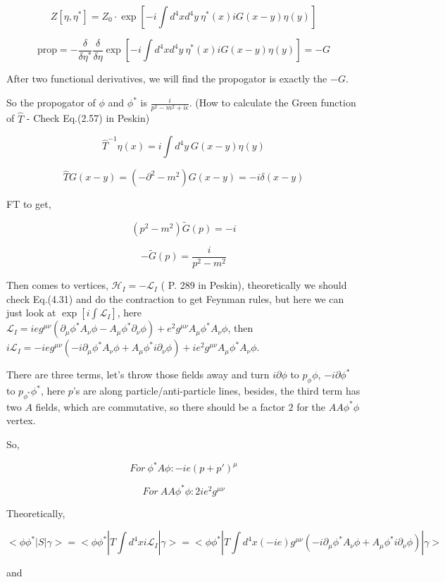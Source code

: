 \documentclass[prd,aps,nofootinbib,floatfix,10pt]{revtex4}
\newcommand{\blue}[1]{{\color{blue} #1}}
\begin{document}
\[ Z[\eta, \eta^*] = Z_0 \cdot \exp[-i\int d^4 x d^4 y \ \eta^*(x) i G(x-y) \eta(y) ] \]

\[ \text{prop} = -\frac{\delta}{\delta \eta^*}\frac{\delta}{\delta \eta} \exp[-i\int d^4 x d^4 y \ \eta^*(x) i G(x-y) \eta(y) ] = -G \]

After two functional derivatives, we will find the propogator is exactly the $-G$.

So the propogator of $\phi$ and $\phi^*$ is $\frac{i}{p^2 - m^2 + i \epsilon}$. (How to calculate the Green function of $\hat{T}$ - \blue{Check Eq.(2.57) in Peskin})

\[ \hat{T}^{-1} \eta(x) = i \int d^4 y \ G(x-y) \eta(y) \]

\[ \hat{T} G(x-y)  = (-\partial^2-m^2) G(x-y) = -i \delta(x-y) \]

FT to get,

\[ (p^2 - m^2) \tilde{G}(p) = -i \]

\[ -\tilde{G}(p) = \frac{i}{p^2 - m^2} \]

Then comes to vertices, $\mathcal{H}_{I} = - \mathcal{L}_I$ (\blue{P. 289 in Peskin}), theoretically we should check \blue{Eq.(4.31)} and do the contraction to get Feynman rules, but here we can just look at $\exp[i \int \mathcal{L}_I]$, here $\mathcal{L}_I = i e g^{\mu \nu} (\partial_{\mu} \phi^* A_{\nu} \phi - A_{\mu} \phi^* \partial_{\nu} \phi) + e^2 g^{\mu \nu} A_{\mu} \phi^* A_{\nu} \phi$, then $i \mathcal{L}_I = -i e g^{\mu \nu} (-i \partial_{\mu} \phi^* A_{\nu} \phi + A_{\mu} \phi^* i \partial_{\nu} \phi) + i e^2 g^{\mu \nu} A_{\mu} \phi^* A_{\nu} \phi$.

There are three terms, let's throw those fields away and turn $i \partial \phi$ to $p_{\phi} \phi$, $-i \partial \phi^*$ to $p_{\phi^*} \phi^*$, here $p$'s are along particle/anti-particle lines, besides, the third term has two $A$ fields, which are commutative, so there should be a factor $2$ for the $AA\phi^*\phi$ vertex.

So, 

\[For\ \phi^* A \phi: -i e (p + p')^{\mu}\]

\[For\ AA\phi^* \phi: 2 i e^2 g^{\mu \nu}\]


Theoretically, 

\[ <\phi \phi^* | S | \gamma> = <\phi \phi^* | T \int d^4 x i \mathcal{L}_I | \gamma> = <\phi \phi^* | T \int d^4 x (-i e) g^{\mu \nu} (-i \partial_{\mu} \phi^* A_{\nu} \phi + A_{\mu} \phi^* i \partial_{\nu} \phi) | \gamma> \]

and 
\end{document}
